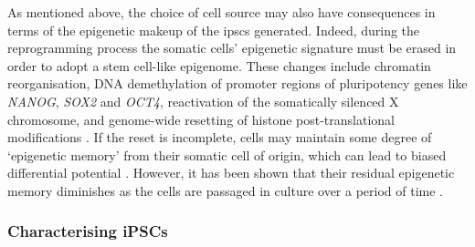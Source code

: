 As mentioned above, the choice of cell source may also have consequences in terms of the epigenetic makeup of the \glspl{ipsc} generated.
Indeed, during the reprogramming process the somatic cells' epigenetic signature must be erased in order to adopt a stem cell-like epigenome.
These changes include chromatin reorganisation, DNA demethylation of promoter regions of pluripotency genes like \textit{NANOG}, \textit{SOX2} and \textit{OCT4}, reactivation of the somatically silenced X chromosome, and genome-wide resetting of histone post-translational modifications \cite{takahashi2007induction, maherali2007directly, wernig2007vitro, buganim2013mechanisms}.
If the reset is incomplete, cells may maintain some degree of `epigenetic memory' from their somatic cell of origin, which can lead to biased differential potential \cite{kim2010epigenetic, polo2010cell}.
However, it has been shown that their residual epigenetic memory diminishes as the cells are passaged in culture over a period of time \cite{ghosh2010persistent}.

\subsubsection{Characterising iPSCs}
\label{sec:ipsc_characterise}

